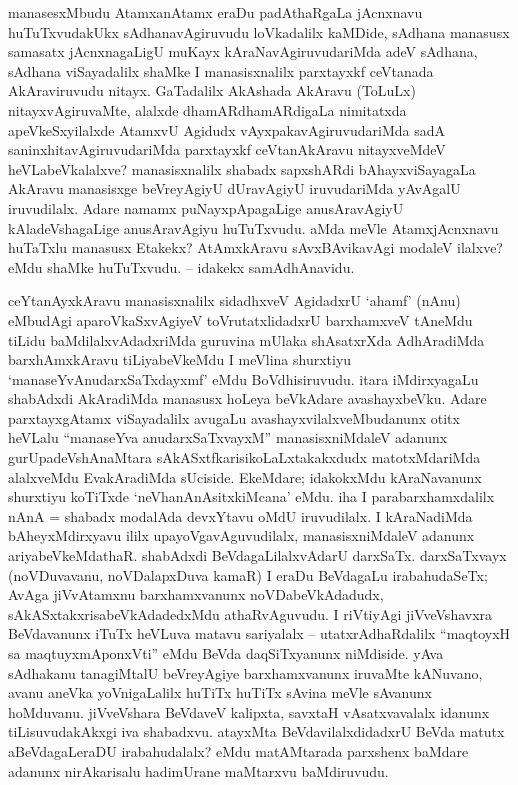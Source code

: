 \begin{artha}
manasesxMbudu AtamxanAtamx eraDu padAthaRgaLa jAcnxnavu huTuTxvudakUkx sAdhanavAgiruvudu loVkadalilx kaMDide, sAdhana manasusx samasatx jAcnxnagaLigU muKayx kAraNavAgiruvudariMda adeV sAdhana, sAdhana viSayadalilx shaMke I manasisxnalilx parxtayxkf ceVtanada AkAraviruvudu nitayx. GaTadalilx AkAshada AkAravu (ToLuLx) nitayxvAgiruvaMte, alalxde dhamARdhamARdigaLa nimitatxda apeVkeSxyilalxde AtamxvU Agidudx vAyxpakavAgiruvudariMda sadA saninxhitavAgiruvudariMda parxtayxkf ceVtanAkAravu nitayxveMdeV heVLabeVkalalxve? manasisxnalilx shabadx sapxshARdi bAhayxviSayagaLa AkAravu manasisxge beVreyAgiyU dUravAgiyU iruvudariMda yAvAgalU iruvudilalx. Adare namamx puNayxpApagaLige anusAravAgiyU kAladeVshagaLige anusAravAgiyu huTuTxvudu. aMda meVle AtamxjAcnxnavu huTaTxlu manasusx Etakekx? AtAmxkAravu sAvxBAvikavAgi modaleV ilalxve? eMdu shaMke huTuTxvudu. -- idakekx samAdhAnavidu. 

ceYtanAyxkAravu manasisxnalilx sidadhxveV AgidadxrU `ahamf' (nAnu) eMbudAgi aparoVkaSxvAgiyeV toVrutatxlidadxrU barxhamxveV tAneMdu tiLidu baMdilalxvAdadxriMda guruvina mUlaka shAsatxrXda AdhAradiMda barxhAmxkAravu tiLiyabeVkeMdu I meVlina shurxtiyu `manaseYvAnudarxSaTxdayxmf' eMdu BoVdhisiruvudu. itara iMdirxyagaLu shabAdxdi AkAradiMda manasusx hoLeya beVkAdare avashayxbeVku. Adare parxtayxgAtamx viSayadalilx avugaLu avashayxvilalxveMbudanunx otitx heVLalu ``manaseYva anudarxSaTxvayxM'' manasisxniMdaleV adanunx gurUpadeVshAnaMtara sAkASxtfkarisikoLaLxtakakxdudx matotxMdariMda alalxveMdu EvakAradiMda sUciside. EkeMdare; idakokxMdu kAraNavanunx shurxtiyu koTiTxde `neVhanAnAsitxkiMcana' eMdu. iha I parabarxhamxdalilx nAnA = shabadx modalAda devxYtavu oMdU iruvudilalx. I kAraNadiMda bAheyxMdirxyavu ililx upayoVgavAguvudilalx, manasisxniMdaleV adanunx ariyabeVkeMdathaR. shabAdxdi BeVdagaLilalxvAdarU darxSaTx. darxSaTxvayx (noVDuvavanu, noVDalapxDuva kamaR) I eraDu BeVdagaLu irabahudaSeTx; AvAga jiVvAtamxnu barxhamxvanunx noVDabeVkAdadudx, sAkASxtakxrisabeVkAdadedxMdu athaRvAguvudu. I riVtiyAgi jiVveVshavxra BeVdavanunx iTuTx heVLuva matavu sariyalalx -- utatxrAdhaRdalilx ``maqtoyxH sa maqtuyxmAponxVti'' eMdu BeVda daqSiTxyanunx niMdiside. yAva sAdhakanu tanagiMtalU beVreyAgiye barxhamxvanunx iruvaMte kANuvano, avanu aneVka yoVnigaLalilx huTiTx huTiTx sAvina meVle sAvanunx hoMduvanu. jiVveVshara BeVdaveV kalipxta, savxtaH vAsatxvavalalx idanunx tiLisuvudakAkxgi iva shabadxvu. atayxMta BeVdavilalxdidadxrU BeVda matutx aBeVdagaLeraDU irabahudalalx? eMdu matAMtarada parxshenx baMdare adanunx nirAkarisalu hadimUrane maMtarxvu baMdiruvudu.
\end{artha}

